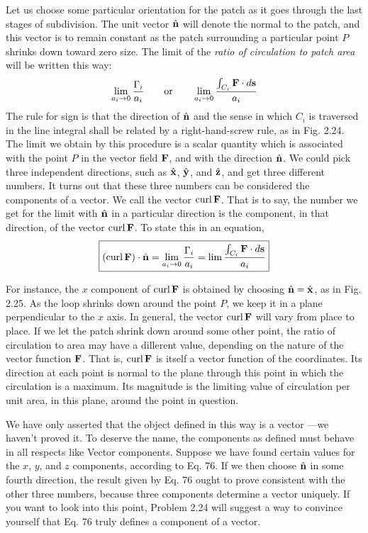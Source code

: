 Let us choose some particular orientation for the patch as it goes
through the last stages of subdivision. The unit vector $\hat{\mathbf{n}}$ will denote
the normal to the patch, and this vector is to remain constant as the
patch surrounding a particular point $P$ shrinks down toward zero
size. The limit of the \emph{ratio of circulation to patch area} will be written
this way:
\begin{equation}
  \lim_{a_i\rightarrow0} \frac{\Gamma_i}{a_i}
  \qquad \text{or} \qquad
  \lim_{a_i\rightarrow0} \frac{\int_{C_i} \mathbf{F}\cdot d\mathbf{s}}{a_i}
\end{equation}
The rule for sign is that the direction of $\hat{\mathbf{n}}$ and the sense in which $C_i$
is traversed in the line integral shall be related by a right-hand-screw
rule, as in Fig. 2.24. The limit we obtain by this procedure is a scalar
quantity which is associated with the point $P$ in the vector field $\mathbf{F}$,
and with the direction $\hat{\mathbf{n}}$. We could pick three independent directions,
such as $\hat{\mathbf{x}}$, $\hat{\mathbf{y}}$, and $\hat{\mathbf{z}}$, and get three different numbers. It turns
out that these three numbers can be considered the components of a
vector. We call the vector $\operatorname{curl}\mathbf{F}$. That is to say, the number we get
for the limit with $\hat{\mathbf{n}}$ in a particular direction is the component, in that
direction, of the vector $\operatorname{curl}\mathbf{F}$. To state this in an equation,
\begin{equation}
\boxed{
  (\operatorname{curl}\mathbf{F})\cdot\hat{\mathbf{n}} = \lim_{a_i\rightarrow0} \frac{\Gamma_i}{a_i}
         = \lim \frac{\int_{C_i} \mathbf{F}\cdot d\mathbf{s}}{a_i}
}
\end{equation}

For instance, the $x$ component of $\operatorname{curl}\mathbf{F}$ is obtained by choosing
$\hat{\mathbf{n}}=\hat{\mathbf{x}}$, as in Fig. 2.25. As the loop shrinks down around the point $P$,
we keep it in a plane perpendicular to the $x$ axis. In general, the
vector $\operatorname{curl}\mathbf{F}$ will vary from place to place. If we let the patch shrink
down around some other point, the ratio of circulation to area may
have a dillerent value, depending on the nature of the vector function
$\mathbf{F}$. That is, $\operatorname{curl}\mathbf{F}$ is itself a vector function of the coordinates.
Its direction at each point is normal to the plane through this point
in which the circulation is a maximum. Its magnitude is the limiting
value of circulation per unit area, in this plane, around the point in
question.

We have only asserted that the object defined in this way is a vector
---we haven't proved it. To deserve the name, the components as
defined must behave in all respects like Vector components. Suppose
we have found certain values for the $x$, $y$, and $z$ components, according
to Eq. 76. If we then choose $\hat{\mathbf{n}}$ in some fourth direction, the result
given by Eq. 76 ought to prove consistent with the other three numbers,
because three components determine a vector uniquely. If you
want to look into this point, Problem 2.24 will suggest a way to convince
yourself that Eq. 76 truly defines a component of a vector.

